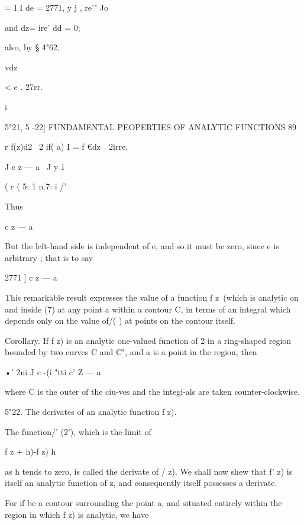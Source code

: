 {{= I I de = 2771, y j , re'" Jo



and dz= ire' dd = 0;



also, by § 4"62,



vdz



< e . 27rr.



i



5"21, 5 -22] FUNDAMENTAL PEOPERTIES OF ANALYTIC FUNCTIONS 89

r f(z)d2 \ 2 if( a) I = f €dz\ \ 2irre.

J c z — a \ J y 1



( r ( 5: 1 n.7: i /'

Thus

c z — a



But the left-hand side is independent of e, and so it must be zero,
since e is arbitrary ; that is to say



    2771 ] c z — a



This remarkable result expresses the value of a function f z\ (which
is analytic on and inside (7) at any point a within a contour C, in
terms of an integral which depends only on the value of/( ) at points
on the contour itself.

Corollary. If f z) is an analytic one-valued function of 2 in a
ring-shaped region bounded by two curves C and C", and a is a point in
the region, then



•' 2ni J c -(i "tti c' Z — a



where C is the outer of the ciu-ves and the integi-als are taken
counter-clockwise.

5"22. The derivates of an analytic function f z).

The function/' (2'), which is the limit of

f z + h)-f z) h

as h tends to zero, is called the derivate of / z). We shall now shew
that f' z) is itself an analytic function of z, and consequently
itself possesses a derivate.

For if be a contour surrounding the point a, and situated entirely
within the region in which f z) is analytic, we have

}}
